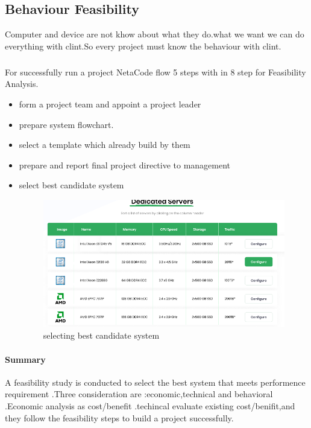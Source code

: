 \documentclass[a4paper,12pt]{book}
\begin{document}
\subsection{Behaviour Feasibility}
Computer and device are not khow about what they do.what we want we can do everything with clint.So every project must know the behaviour with clint.
\subparagraph{}
For successfully run a project NetaCode flow 5 steps with in 8 step for Feasibility Analysis.
\begin{itemize}
	\item form a project team and appoint a project leader
	\item prepare system flowchart.
	\item select a template which  already build by them
	\item prepare and report final project directive to management
	\item select best candidate system
	\begin{figure}[h]
	\centering
	\includegraphics[width=0.9\linewidth]{7_3}
	\caption{selecting best candidate system}
	\label{fig:73}
   \end{figure}
\end{itemize}
 \newpage
\paragraph{Summary\\}
A feasibility study is conducted to select the best system that meets performence requirement .Three consideration are :economic,technical and behavioral .Economic analysis as cost/benefit .techincal evaluate existing cost/benifit,and they follow the feasibility steps to build a project successfully.
\end{document}
